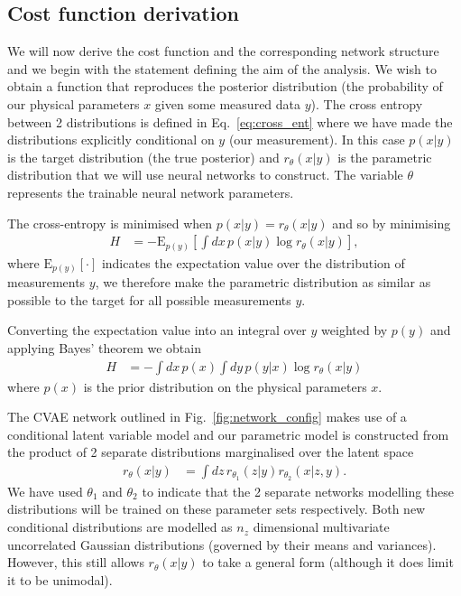 \documentclass[%
showpacs,
 amsmath,amssymb,
 aps,
 twocolumn,
 prl,
 reprint,
floatfix,
]{revtex4-1}
\begin{document}
\subsection{Cost function derivation}
%
%
We will now derive the cost function and the corresponding network structure
and we begin with the statement defining the aim of the analysis. We wish to
obtain a function that reproduces the posterior distribution (the probability
of our physical parameters $x$ given some measured data $y$). The cross entropy
between 2 distributions is defined in Eq.~\ref{eq:cross_ent} where we have made
the distributions explicitly conditional on $y$ (our measurement). In this case
$p(x|y)$ is the target distribution (the true posterior) and $r_{\theta}(x|y)$
is the parametric distribution that we will use neural networks to construct.
The variable $\theta$ represents the trainable neural network parameters. 

The cross-entropy is minimised when $p(x|y)=r_{\theta}(x|y)$ and so by
minimising
%
\begin{align}\label{eq:cost1}
H &= -\text{E}_{p(y)}\left[\int dx\,p(x|y) \log r_{\theta}(x|y)\right],
\end{align}
% 
where $\text{E}_{p(y)}[\cdot]$ indicates the expectation value over the
distribution of measurements $y$, we therefore make the parametric distribution
as similar as possible to the target for all possible measurements $y$.

Converting the expectation value into an integral over $y$ weighted by $p(y)$
and applying Bayes' theorem we obtain
%
\begin{align}\label{eq:cost1}
H &= -\int dx\,p(x)\int dy\,p(y|x)\log r_{\theta}(x|y)
\end{align}
%
where $p(x)$ is the prior distribution on the physical parameters $x$.

The \ac{CVAE} network outlined in Fig.~\ref{fig:network_config} makes use of a
conditional latent variable model and our parametric model is constructed from
the product of 2 separate distributions marginalised over the latent space
%
\begin{align}\label{eq:latent_model}
r_{\theta}(x|y) &= \int dz\,r_{\theta_{1}}(z|y)r_{\theta_{2}}(x|z,y).
\end{align}
%  
We have used $\theta_{1}$ and $\theta_{2}$ to indicate that the 2 separate
networks modelling these distributions will be trained on these parameter sets
respectively. Both new conditional distributions are modelled as $n_{z}$
dimensional multivariate uncorrelated Gaussian distributions (governed by their
means and variances). However, this still allows $r_{\theta}(x|y)$ to take a
general form (although it does limit it to be unimodal).  
\end{document}
